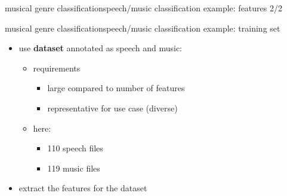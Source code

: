         \begin{frame}{musical genre classification}{speech/music classification example: features 2/2}
        \end{frame}

        \begin{frame}{musical genre classification}{speech/music classification example: training set}
            \begin{itemize}
                \item	use \textbf{dataset} annotated as speech and music:
                    \begin{itemize}
                        \item	requirements
                            \begin{itemize}
                                \item	large compared to number of features
                                \item	representative for use case (diverse)
                            \end{itemize}
                        \item	here:
                            \begin{itemize}
                                \item	110 speech files
                                \item	119 music files
                            \end{itemize}
                    \end{itemize}
                \bigskip
                \item	extract the features for the dataset
            \end{itemize}
        \end{frame}

